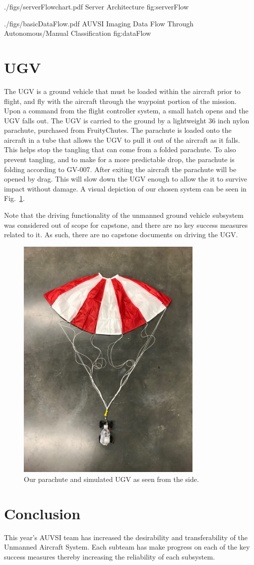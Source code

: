 \documentclass[]{auvsi_doc}
\begin{document}
\AUVSIFigure
{./figs/serverFlowchart.pdf}
{\textwidth}
{Server Architecture}
{fig:serverFlow}


\AUVSIFigure
{./figs/basicDataFlow.pdf}
{\textwidth}
{AUVSI Imaging Data Flow Through Autonomous/Manual Classification}
{fig:dataFlow}


\section{UGV}

The UGV is a ground vehicle that must be loaded within the aircraft prior to flight, and fly with the aircraft through the waypoint portion of the mission. 
Upon a command from the flight controller system, a small hatch opens and the UGV falls out.
The UGV is carried to the ground by a lightweight 36 inch nylon parachute, purchased from FruityChutes.
The parachute is loaded onto the aircraft in a tube that allows the UGV to pull it out of the aircraft as it falls.
This helps stop the tangling that can come from a folded parachute.
To also prevent tangling, and to make for a more predictable drop, the parachute is folding according to GV-007.
After exiting the aircraft the parachute will be opened by drag.
This will slow down the UGV enough to allow the it to survive impact without damage.
A visual depiction of our chosen system can be seen in Fig.~\ref{fig:side}.

Note that the driving functionality of the unmanned ground vehicle subsystem was considered out of scope for capstone, and there are no key success measures related to it.
As such, there are no capstone documents on driving the UGV.

\begin{figure}[h]
\centering
\includegraphics[width=90mm]{./figs/Parachute_Side.jpg}
\caption{Our parachute and simulated UGV as seen from the side.}
\label{fig:side}
\end{figure}

\section{Conclusion}

This year's AUVSI team has increased the desirability and transferability of the Unmanned Aircraft System. Each subteam
has make progress on each of the key success measures thereby increasing the reliability of each subsystem.
\end{document}
